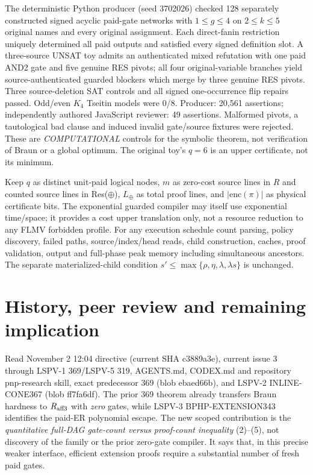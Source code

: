 \documentclass[11pt]{article}
\begin{document}
The deterministic Python producer (seed 3702026) checked 128 separately constructed signed acyclic paid-gate networks with $1\le g\le4$ on $2\le k\le5$ original names and every original assignment. Each direct-fanin restriction uniquely determined all paid outputs and satisfied every signed definition slot. A three-source UNSAT toy admits an authenticated mixed refutation with one paid AND2 gate and five genuine RES pivots; all four original-variable branches yield source-authenticated guarded blockers which merge by three genuine RES pivots. Three source-deletion SAT controls and all signed one-occurrence flip repairs passed. Odd/even $K_4$ Tseitin models were 0/8. Producer: 20,561 assertions; independently authored JavaScript reviewer: 49 assertions. Malformed pivots, a tautological bad clause and induced invalid gate/source fixtures were rejected. These are \emph{COMPUTATIONAL} controls for the symbolic theorem, not verification of Braun or a global optimum. The original toy's $q=6$ is an upper certificate, not its minimum.

Keep $q$ as distinct unit-paid logical nodes, $m$ as zero-cost source lines in $R$ and counted source lines in Res($\oplus$), $L_{\oplus}$ as total proof lines, and $|\mathrm{enc}(\pi)|$ as physical certificate bits. The exponential guarded compiler may itself use exponential time/space; it provides a cost upper translation only, not a resource reduction to any FLMV forbidden profile. For any execution schedule count parsing, policy discovery, failed paths, source/index/head reads, child construction, caches, proof validation, output and full-phase peak memory including simultaneous ancestors. The separate materialized-child condition $s'\le\max\{\rho,\eta,\lambda,\lambda s\}$ is unchanged.

\section*{History, peer review and remaining implication}
Read November 2 12:04 directive (current SHA c3889a3e), current issue 3 through LSPV-1 369/LSPV-5 319, AGENTS.md, CODEX.md and repository pnp-research skill, exact predecessor 369 (blob ebaed66b), and LSPV-2 INLINE-CONE367 (blob ff7fa6df). The prior 369 theorem already transfers Braun hardness to $R_{\rm aff3}$ with \emph{zero} gates, while LSPV-3 BPHP-EXTENSION343 identifies the paid-ER polynomial escape. The new scoped contribution is the \emph{quantitative full-DAG gate-count versus proof-count inequality} (2)--(5), not discovery of the family or the prior zero-gate compiler. It says that, in this precise weaker interface, efficient extension proofs require a substantial number of fresh paid gates.
\end{document}
